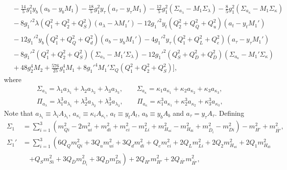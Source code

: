 \documentclass[preprint,amsmath,amssymb,aps,superscriptaddress,prd,showpacs,floatfix,nofootinbib]{revtex4-1}
\begin{document}
\begin{subequations}
\begin{align}
&{}-\frac{14}{5}g_1^2y_b\left ( a_b-y_bM_1\right )-\frac{18}{5}g_1^2y_\tau\left ( a_\tau-y_\tau M_1\right )-\frac{12}{5}g_1^2\left ( \Sigma_{a_\lambda}-M_1\Sigma_\lambda\right )-\frac{8}{5}g_1^2\left ( \Sigma_{a_\kappa}-M_1\Sigma_\kappa\right )\nonumber\\
&{}-8g_1'^2\lambda\left ( Q_1^2+Q_2^2+Q_S^2\right )\left ( a_\lambda-\lambda M_1'\right )-12g_1'^2y_t\left ( Q_2^2+Q_Q^2+Q_u^2\right )\left ( a_t-y_tM_1'\right )\nonumber\\
&{}-12g_1'^2y_b\left ( Q_1^2+Q_Q^2+Q_d^2\right )\left ( a_b-y_bM_1'\right )-4g_1'^2y_\tau\left ( Q_1^2+Q_L^2+Q_e^2\right )\left ( a_\tau-y_\tau M_1'\right )\nonumber\\
&{}-8g_1'^2\left ( Q_1^2+Q_2^2+Q_S^2\right )\left ( \Sigma_{a_\lambda}-M_1'\Sigma_\lambda \right )-12g_1'^2\left ( Q_S^2+Q_D^2+Q_{\overline{D}}^2\right )\left (\Sigma_{a_\kappa}-M_1'\Sigma_{\kappa}\right )\nonumber\\
&{}+48g_2^4M_2+\frac{576}{25}g_1^4M_1+8g_1'^4M_1'\Sigma_Q\left ( Q_1^2+Q_2^2+Q_S^2\right )\bigg ],\label{eq:USSMTLambdaOt2Coeff}
\end{align}
\end{subequations}
where
\begin{align*}
&\Sigma_{a_\lambda}=\lambda_1 a_{\lambda_1}+\lambda_2 a_{\lambda_2}+\lambda_3 a_{\lambda_3},\qquad \Sigma_{a_\kappa}=\kappa_1 a_{\kappa_1}+\kappa_2 a_{\kappa_2}+\kappa_3 a_{\kappa_3},\\
&\Pi_{a_\lambda}=\lambda_1^3 a_{\lambda_1}+\lambda_2^3 a_{\lambda_2}+\lambda_3^3 a_{\lambda_3},\qquad \Pi_{a_\kappa}=\kappa_1^3 a_{\kappa_1}+\kappa_2^3 a_{\kappa_2}+\kappa_3^3 a_{\kappa_3},
\end{align*}
Note that $a_{\lambda_i}\equiv\lambda_i A_{\lambda_i}$, $a_{\kappa_i}\equiv\kappa_i A_{\kappa_i}$, $a_t\equiv y_t A_t$, $a_b\equiv y_b A_b$ and $a_\tau= y_\tau A_\tau$. Defining 
\begin{align}
\Sigma_1&=\sum_{i=1}^3\left ( m_{Qi}^2-2m_{ui}^2+m_{di}^2+m_{ei}^2-m_{Li}^2+m_{H_{ui}}^2-m_{H_{di}}^2+m_{\overline{D}_i}^2-m_{Di}^2\right )-m_{H'}^2+m_{\overline{H'}}^2,\label{eq:USSMGaugeSigmaTerm1}\\
\Sigma_1'&=\sum_{i=1}^3\left ( 6Q_Qm_{Qi}^2+3Q_um_{ui}^2+3Q_dm_{di}^2+Q_em_{ei}^2+2Q_Lm_{Li}^2+2Q_2m_{H_{ui}}^2+2Q_1m_{H_{di}}^2\right.\nonumber\\
&\quad{}\left.+Q_Sm_{Si}^2+3Q_{\overline{D}}m_{\overline{D}_i}^2+3Q_Dm_{Di}^2\right )+2Q_{H'}m_{H'}^2+2Q_{\overline{H'}}m_{\overline{H'}}^2,\label{eq:USSMGaugeSigmaTerm1Pr}
\end{align}
\end{document}
